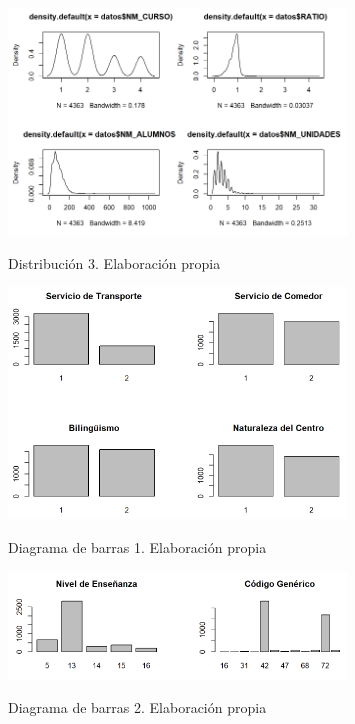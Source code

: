 \begin{subappendices}
\begin{figure}[htb]
	\centering
	\caption{Distribución 3. Elaboración propia}
	\includegraphics[width=0.8\textwidth]{recursos/ImagenesR/norm3}
	\label{fig:norm3}
\end{figure}
\FloatBarrier

\begin{figure}[htb]
	\centering
	\caption{Diagrama de barras 1. Elaboración propia}
	\includegraphics[width=0.8\textwidth]{recursos/ImagenesR/barplot1}
	\label{fig:barplot1}
\end{figure}
\FloatBarrier

\begin{figure}[htb]
	\centering
	\caption{Diagrama de barras 2. Elaboración propia}
	\includegraphics[width=0.8\textwidth]{recursos/ImagenesR/barplot2}
	\label{fig:barplot2}
\end{figure}
\FloatBarrier


\end{subappendices}
